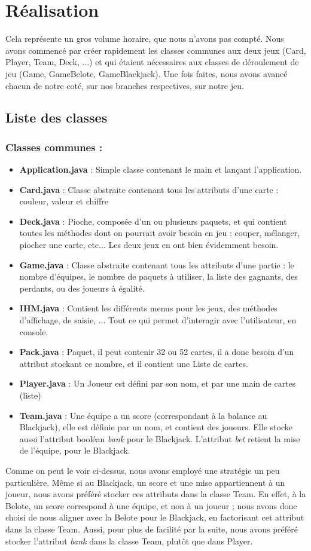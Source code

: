 \documentclass[a4paper]{report}
\begin{document}
\newpage
\section{Réalisation}
Cela représente un gros volume horaire, que nous n'avons pas compté. Nous avons commencé par créer rapidement les classes communes aux deux jeux (Card, Player, Team, Deck, ...) et qui étaient nécessaires aux classes de déroulement de jeu (Game, GameBelote, GameBlackjack). Une fois faites, nous avons avancé chacun de notre coté, sur nos branches respectives, sur notre jeu.  
\subsection{Liste des classes}
\subsubsection{Classes communes :}
\begin{itemize}
\item \textbf{Application.java} : Simple classe contenant le main et lançant l'application.
\item \textbf{Card.java} : Classe abstraite contenant tous les attributs d'une carte : couleur, valeur et chiffre
\item \textbf{Deck.java} : Pioche, composée d'un ou plusieurs paquets, et qui contient toutes les méthodes dont on pourrait avoir besoin en jeu : couper, mélanger, piocher une carte, etc... Les deux jeux en ont bien évidemment besoin.
\item \textbf{Game.java} : Classe abstraite contenant tous les attributs d'une partie : le nombre d'équipes, le nombre de paquets à utiliser, la liste des gagnants, des perdants, ou des joueurs à égalité.
\item \textbf{IHM.java} : Contient les différents menus pour les jeux, des méthodes d'affichage, de saisie, ... Tout ce qui permet d'interagir avec l'utilisateur, en console.
\item \textbf{Pack.java} : Paquet, il peut contenir 32 ou 52 cartes, il a donc besoin d'un attribut stockant ce nombre, et il contient une Liste de cartes.
\item \textbf{Player.java} : Un Joueur est défini par son nom, et par une main de cartes (liste)
\item \textbf{Team.java} : Une équipe a un score (correspondant à la balance au Blackjack), elle est définie par un nom, et contient des joueurs. Elle stocke aussi l'attribut booléan \textit{bank} pour le Blackjack. L'attribut \textit{bet} retient la mise de l'équipe, pour le Blackjack.
\end{itemize}
Comme on peut le voir ci-dessus, nous avons employé une stratégie un peu particulière. Même si au Blackjack, un score et une mise appartiennent à un joueur, nous avons préféré stocker ces attributs dans la classe Team. En effet, à la Belote, un score correspond à une équipe, et non à un joueur ; nous avons donc choisi de nous aligner avec la Belote pour le Blackjack, en factorisant cet attribut dans la classe Team. Aussi, pour plus de facilité par la suite, nous avons préféré stocker l'attribut \textit{bank} dans la classe Team, plutôt que dans Player.
\end{document}

